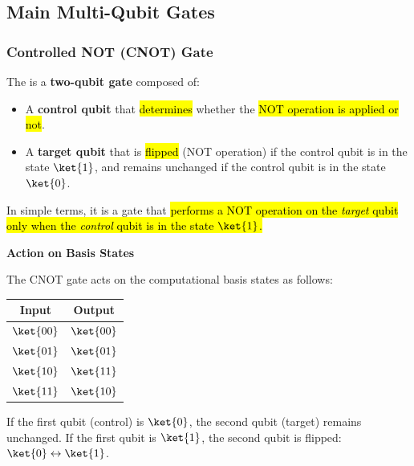 \subsection{Main Multi-Qubit Gates}\label{sec:main-multi-qubit-gates}

\subsubsection{Controlled NOT (CNOT) Gate}\label{sec:controlled-not-cnot-gate}

The  is a \textbf{two-qubit gate} composed of:
\begin{itemize}
    \item A \textbf{control qubit} that \hl{determines} whether the \hl{NOT operation is applied or not}.
    \item A \textbf{target qubit} that is \hl{flipped} (NOT operation) if the control qubit is in the state $\ket{1}$, and remains unchanged if the control qubit is in the state $\ket{0}$.
\end{itemize}
In simple terms, it is a gate that \hl{performs a NOT operation on the \emph{target} qubit only when the \emph{control} qubit is in the state $\ket{1}$.}

\highspace
\begin{flushleft}
    \textcolor{Green3}{ \textbf{Action on Basis States}}
\end{flushleft}
The CNOT gate acts on the computational basis states as follows:

\begin{table}[!htp]
    \centering
    \begin{tabular}{@{} c | c @{}}
        \toprule
        \textbf{Input} & \textbf{Output} \\
        \midrule
        $\ket{00}$ & $\ket{00}$ \\
        $\ket{01}$ & $\ket{01}$ \\
        $\ket{10}$ & $\ket{11}$ \\
        $\ket{11}$ & $\ket{10}$ \\
        \bottomrule
    \end{tabular}
\end{table}

\noindent
If the first qubit (control) is $\ket{0}$, the second qubit (target) remains unchanged. If the first qubit is $\ket{1}$, the second qubit is flipped: $\ket{0} \leftrightarrow \ket{1}$.

